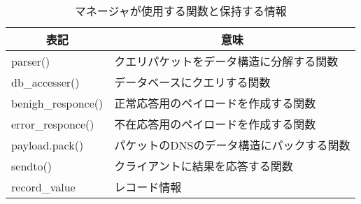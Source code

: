 \begin{table}[htb]
 \caption{マネージャが使用する関数と保持する情報}
 \centering
  \begin{tabular}{ll}
    \toprule
		\multicolumn{1}{c}{\textbf{表記}} & \multicolumn{1}{c}{\textbf{意味}} \\
    \midrule
		parser() & クエリパケットをデータ構造に分解する関数 \\
		db\_accesser() & データベースにクエリする関数 \\
		benigh\_responce() & 正常応答用のペイロードを作成する関数 \\
		error\_responce() & 不在応答用のペイロードを作成する関数 \\
		payload.pack() & パケットのDNSのデータ構造にパックする関数 \\
		sendto() & クライアントに結果を応答する関数 \\
		record\_value & レコード情報 \\
    \bottomrule
  \end{tabular}
 \label{tab:discription-manager}
\end{table}
